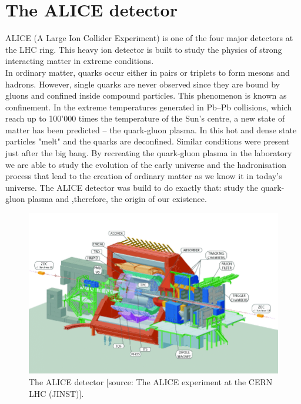 \section{The ALICE detector}
ALICE (A Large Ion Collider Experiment) is one of the four major detectors at the LHC ring. This heavy ion detector is built to study the physics of strong interacting matter in extreme conditions. \\
In ordinary matter, quarks occur either in pairs or triplets to form mesons and hadrons. However, single quarks are never observed since they are bound by gluons and confined inside compound particles. This phenomenon is known as confinement. In the extreme temperatures generated in Pb--Pb collisions, which reach up to 100'000 times the temperature of the Sun's centre, a new state of matter has been predicted -- the quark-gluon plasma. In this hot and dense state particles "melt" and the quarks are deconfined. Similar conditions were present just after the big bang. By recreating the quark-gluon plasma in the laboratory we are able to study the evolution of the early universe and the hadronisation process that lead to the creation of ordinary matter as we know it in today's universe. The ALICE detector was build to do exactly that: study the quark-gluon plasma and ,therefore, the origin of our existence.\\
\begin{figure}[]
		\includegraphics[width=\textwidth]{pictures/The-ALICE-Detector-Figure-taken-from-6.png}
		\caption{The ALICE detector [source: The ALICE experiment at the CERN LHC (JINST)].}
		\label{fig:ALICE_sketch}
\end{figure}
